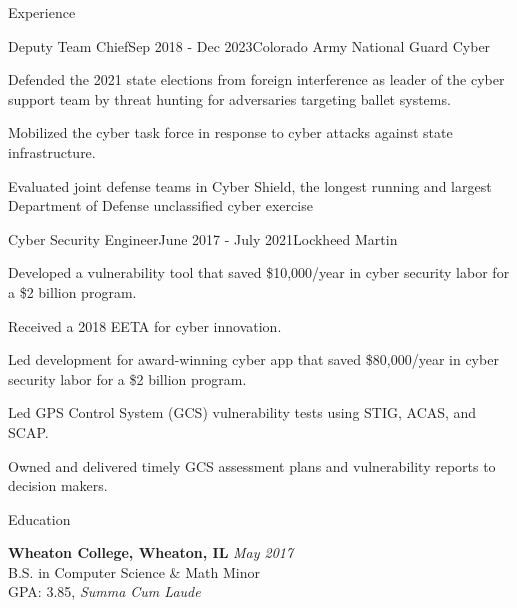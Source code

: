 \documentclass[
	11pt, %
]{resume} %
\begin{document}
\begin{rSection}{Experience}

	\begin{rSubsection}{Deputy Team Chief}{Sep 2018 - Dec 2023}{Colorado Army National Guard Cyber}
		\item Defended the 2021 state elections from foreign interference as leader of the cyber support team by threat hunting for adversaries targeting ballet systems.
		\item Mobilized the cyber task force in response to cyber attacks against state infrastructure.
		\item Evaluated joint defense teams in Cyber Shield, the longest running and largest Department of Defense unclassified cyber exercise
	\end{rSubsection}


	\begin{rSubsection}{Cyber Security Engineer}{June 2017 - July 2021}{Lockheed Martin}
		\item Developed a vulnerability tool that saved \$10,000/year in cyber security labor for a \$2 billion program.
		\item Received a 2018 EETA for cyber innovation.
		\item Led development for award-winning cyber app that saved \$80,000/year in cyber security labor for a \$2 billion program.
		\item Led GPS Control System (GCS) vulnerability tests using STIG, ACAS, and SCAP.
		\item Owned and delivered timely GCS assessment plans and vulnerability reports to decision makers.
	\end{rSubsection}
\end{rSection}


\begin{rSection}{Education}
	
	\textbf{Wheaton College, Wheaton, IL} \hfill \textit{May 2017} \\ 
	B.S. in Computer Science \& Math Minor \\
	GPA: 3.85, \textit{Summa Cum Laude} \\
	
\end{rSection}
\end{document}
